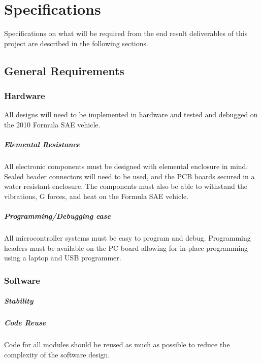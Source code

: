 %
%
%
%

\chapter{Specifications}

Specifications on what will be required from the end result deliverables of this project are described in the following sections.

\section{General Requirements}

\subsection{Hardware}

All designs will need to be implemented in hardware and tested and debugged on the 2010 Formula SAE vehicle.

\paragraph{Elemental Resistance}
All electronic components must be designed with elemental enclosure in mind. Sealed header connectors will need to be used, and the PCB boards secured in a water resistant enclosure. The components must also be able to withstand the vibrations, G forces, and heat on the Formula SAE vehicle.

\paragraph{Programming/Debugging ease}
All microcontroller systems must be easy to program and debug. Programming headers must be available on the PC board allowing for in-place programming using a laptop and USB programmer.

\subsection{Software}

\paragraph{Stability}

\paragraph{Code Reuse}
Code for all modules should be reused as much as possible to reduce the complexity of the software design.

